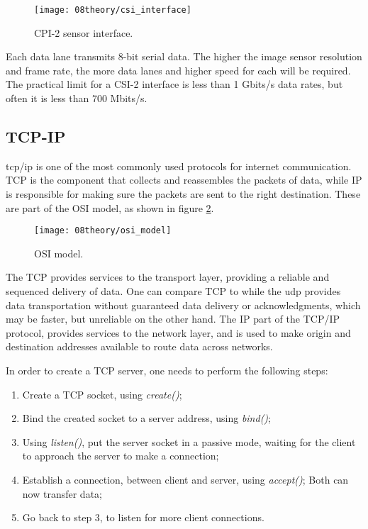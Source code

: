 \begin{figure}[H]
	\centering
	\texttt{[image: 08theory/csi\_interface]}
	\caption{CPI-2 sensor interface.}
	\label{fig:csi_interface}
\end{figure}

Each data lane transmits 8-bit serial data. The higher the image sensor resolution and frame rate, the more data lanes and higher speed for each will be required. The practical limit for a CSI-2 interface is less than 1 Gbits/s data rates, but often it is less than 700 Mbits/s. \cite{csi_interface}

\clearpage
\subsection{TCP-IP}
\ac{tcp}/\ac{ip} is one of the most commonly used protocols for internet communication. TCP is the component that collects and reassembles the packets of data, while IP is responsible for making sure the packets are sent to the right destination. These are part of the OSI model, as shown in figure \ref{fig:osi_model}.

\begin{figure}[H]
	\centering
	\texttt{[image: 08theory/osi\_model]}
	\caption{OSI model.}
	\label{fig:osi_model}
\end{figure}

The TCP provides services to the transport layer, providing a reliable and sequenced delivery of data. One can compare TCP to while the \ac{udp} provides data transportation without guaranteed data delivery or acknowledgments, which may be faster, but unreliable on the other hand. The IP part of the TCP/IP protocol, provides services to the network layer, and is used to make origin and destination addresses available to route data across networks.

\clearpage
{}

In order to create a TCP server, one needs to perform the following steps:
\begin{enumerate}
	\item Create a TCP socket, using \textit{create()};
	\item Bind the created socket to a server address, using \textit{bind()};
	\item Using \textit{listen()}, put the server socket in a passive mode, waiting for the client to approach the server to make a connection;
	\item Establish a connection, between client and server, using \textit{accept()}; Both can now transfer data;
	\item Go back to step 3, to listen for more client connections.	
\end{enumerate}

